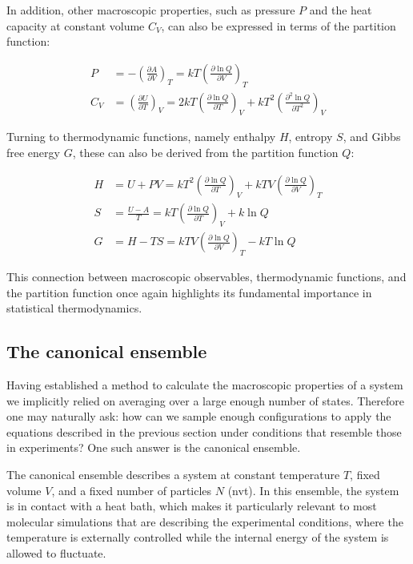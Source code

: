 In addition, other macroscopic properties, such as pressure $P$ and the heat capacity at constant volume $C_V$, can also be expressed in terms of the partition function:

\begin{align}
    P &= -\left(\frac{\partial A}{\partial V}\right)_T = kT\left(\frac{\partial \ln Q}{\partial V}\right)_T \\
    C_V &= \left(\frac{\partial U}{\partial T}\right)_V = 2kT\left(\frac{\partial \ln Q}{\partial T}\right)_V + kT^2\left(\frac{\partial^2 \ln Q}{\partial T^2}\right)_V
\end{align}

Turning to thermodynamic functions, namely enthalpy $H$, entropy $S$, and Gibbs free energy $G$, these can also be derived from the partition function $Q$:

\begin{align}
    H &= U + PV = kT^2\left(\frac{\partial \ln Q}{\partial T}\right)_V + kTV\left(\frac{\partial \ln Q}{\partial V}\right)_T \\
    S &= \frac{U-A}{T} = kT\left(\frac{\partial \ln Q}{\partial T}\right)_V + k\ln Q \\
    G &= H - TS = kTV\left(\frac{\partial \ln Q}{\partial V}\right)_T - kT\ln Q
\end{align}

This connection between macroscopic observables, thermodynamic functions, and the partition function once again highlights its fundamental importance in statistical thermodynamics.



\subsection{The canonical ensemble}
Having established a method to calculate the macroscopic properties of a system we implicitly relied on averaging over a large enough number of states. Therefore one may naturally ask: how can we sample enough configurations to apply the equations described in the previous section under conditions that resemble those in experiments? One such answer is the canonical ensemble.

The canonical ensemble describes a system at constant temperature $T$, fixed volume $V$, and a fixed number of particles $N$ (\acs{nvt}). In this ensemble, the system is in contact with a heat bath, which makes it particularly relevant to most molecular simulations that are describing the experimental conditions, where the temperature is externally controlled while the internal energy of the system is allowed to fluctuate.

